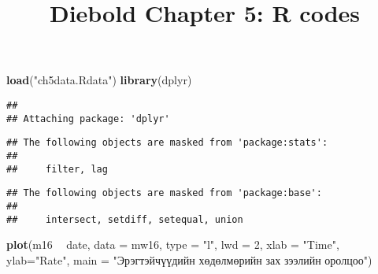 \documentclass[]{article}
\title{Diebold Chapter 5: R codes}
\author{}
\date{}
\newenvironment{Shaded}{\begin{snugshade}}{\end{snugshade}}
\newcommand{\DataTypeTok}[1]{\textcolor[rgb]{0.13,0.29,0.53}{#1}}
\newcommand{\DecValTok}[1]{\textcolor[rgb]{0.00,0.00,0.81}{#1}}
\newcommand{\KeywordTok}[1]{\textcolor[rgb]{0.13,0.29,0.53}{\textbf{#1}}}
\newcommand{\NormalTok}[1]{#1}
\newcommand{\OperatorTok}[1]{\textcolor[rgb]{0.81,0.36,0.00}{\textbf{#1}}}
\newcommand{\StringTok}[1]{\textcolor[rgb]{0.31,0.60,0.02}{#1}}
\begin{document}
\maketitle

\begin{Shaded}
\begin{Highlighting}[]
\KeywordTok{load}\NormalTok{(}\StringTok{"ch5data.Rdata"}\NormalTok{)}
\KeywordTok{library}\NormalTok{(dplyr)}
\end{Highlighting}
\end{Shaded}

\begin{verbatim}
## 
## Attaching package: 'dplyr'
\end{verbatim}

\begin{verbatim}
## The following objects are masked from 'package:stats':
## 
##     filter, lag
\end{verbatim}

\begin{verbatim}
## The following objects are masked from 'package:base':
## 
##     intersect, setdiff, setequal, union
\end{verbatim}

\begin{Shaded}
\end{Shaded}

\begin{Shaded}
\begin{Highlighting}[]
\KeywordTok{plot}\NormalTok{(m16 }\OperatorTok{~}\StringTok{ }\NormalTok{date, }\DataTypeTok{data =}\NormalTok{ mw16, }
     \DataTypeTok{type =} \StringTok{"l"}\NormalTok{, }
     \DataTypeTok{lwd  =} \DecValTok{2}\NormalTok{, }
     \DataTypeTok{xlab =} \StringTok{"Time"}\NormalTok{, }
     \DataTypeTok{ylab=}\StringTok{"Rate"}\NormalTok{, }
     \DataTypeTok{main =} \StringTok{"Эрэгтэйчүүдийн хөдөлмөрийн зах зээлийн оролцоо"}\NormalTok{)}
\end{Highlighting}
\end{Shaded}
\end{document}
